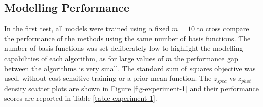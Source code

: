 \documentclass[useAMS,usenatbib,fleqn]{mn2e}
\begin{document}
\subsection{Modelling Performance}

In the first test, all models were trained using a fixed $m=10$ to cross compare the performance of the methods using the same number of basis functions. The number of basis functions was set deliberately low to highlight the modelling capabilities of each algorithm, as for large values of $m$ the performance gap between the algorithms is very small. The standard sum of squares objective was used, without cost sensitive training or a prior mean function. The $z_{spec}$ vs $z_{phot}$ density scatter plots are shown in Figure \ref{fig-experiment-1} and their performance scores are reported in Table \ref{table-experiment-1}.
\end{document}
